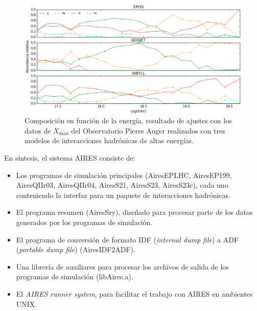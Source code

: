 \documentclass[11pt,table,compress]{beamer}
\begin{document}
\begin{frame}
	\begin{figure}
	\centering
	\includegraphics[width=\textwidth,height=0.7\textheight]{Figuras/composition} 
	\caption{Composición en función de la energía, resultado de ajustes con los datos de $X_{\text{max}}$ del Observatorio Pierre Auger 				realizados con tres modelos de interacciones hadrónicas de altas energías.}
	\label{fig:composition}
	\end{figure}	
\end{frame}

\begin{frame}
En síntesis, el sistema AIRES consiste de:\vspace{0.3 cm}
	\begin{itemize}
	\item Los programas de simulación principales (AiresEPLHC, AiresEP199, AiresQIIr03, AiresQIIr04, AiresS21, AiresS23, AiresS23c), cada uno 			conteniendo la interfaz para un paquete de interacciones hadrónicas. \vspace{0.3 cm}
	\item El programa resumen (AiresSry), diseñado para procesar parte de los datos generados por los programas de simulación. \vspace{0.3 cm}
	\item El programa de conversión de formato IDF (\textit{internal dump file}) a ADF (\textit{portable dump file}) (AiresIDF2ADF). \vspace{0.3 		cm}
	\item Una librería de auxiliares para procesar los archivos de salida de los programas de simulación (libAires.a). \vspace{0.3 cm}
	\item El \textit{AIRES runner system}, para facilitar el trabajo con AIRES en ambientes UNIX. \vspace{0.3 cm}
	\end{itemize}
\end{frame}
\end{document}
